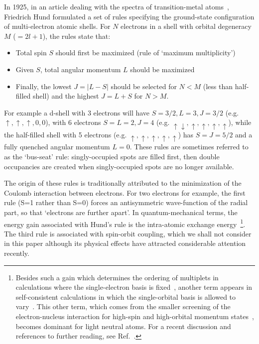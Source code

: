 \documentclass[]{ar2e-changed}%
\begin{document}
In 1925, in an article dealing with the spectra of transition-metal atoms~\cite{hund_1925}, 
Friedrich Hund formulated a set of rules specifying the ground-state configuration of 
multi-electron atomic shells. 
%
For $N$ electrons in a shell with orbital degeneracy $M$ ($=2l+1$), the rules state that: 
\begin{itemize}
\item Total spin $S$ should first be maximized (rule of `maximum multiplicity') 
\item Given $S$, total angular momentum $L$ should be maximized 
\item Finally, the lowest $J=|L-S|$ should be selected for $N<M$ (less than half-filled shell) and the 
highest $J=L+S$ for $N>M$. 
\end{itemize}
%
For example a d-shell with 3 electrons will have $S=3/2, L=3, J=3/2$ (e.g.  
$\uparrow,\uparrow,\uparrow,0,0$), with 6 electrons 
$S=L=2, J=4$ (e.g. $\uparrow\downarrow,\uparrow,\uparrow,\uparrow,\uparrow$), while 
the half-filled shell with 5 electrons (e.g. $\uparrow,\uparrow,\uparrow,\uparrow,\uparrow$)  
has $S=J=5/2$ and a fully quenched angular momentum $L=0$. 
%
These rules are sometimes referred to as the `bus-seat' rule: 
singly-occupied spots are filled first, then double occupancies are created when singly-occupied 
spots are no longer available.  

The origin of these rules is traditionally attributed to the minimization of the Coulomb interaction between electrons. 
%
For two electrons for example, the first rule (S=1 rather than S=0) forces an antisymmetric wave-function of the radial part, 
so that `electrons are further apart'. 
In quantum-mechanical terms, the energy gain associated with Hund's
rule is the intra-atomic exchange energy~\footnote{Besides such a gain which
determines the ordering of multiplets in calculations where the
single-electron basis is fixed~\cite{slater_phys_rev_1929}, another term
appears in self-consistent calculations in which the single-orbital basis is
allowed to vary~\cite{levine_quantum_chemistry_book}. This other term, which comes from the smaller
screening of the electron-nucleus interaction for high-spin and
high-orbital momentum states~\cite{boyd_hund_nature_1984}, becomes
dominant for light neutral atoms. For a recent discussion and references to further reading, see Ref.~\cite{oyamada_j_chem_phys_2010}.}.
The third rule is associated with spin-orbit coupling,  
which we shall not consider in this paper although its physical effects have attracted considerable attention recently.
\end{document}
